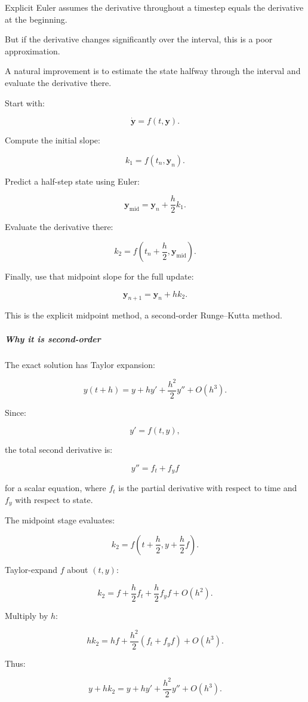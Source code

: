 Explicit Euler assumes the derivative throughout a timestep equals the derivative at the beginning.

But if the derivative changes significantly over the interval, this is a poor approximation.

A natural improvement is to estimate the state halfway through the interval and evaluate the derivative there.

Start with:

\[
\dot{\mathbf y}=f(t,\mathbf y).
\]

Compute the initial slope:

\[
k_1=f(t_n,\mathbf y_n).
\]

Predict a half-step state using Euler:

\[
\mathbf y_{\mathrm{mid}} = \mathbf y_n+\frac h2k_1.
\]

Evaluate the derivative there:

\[
k_2=f\left(t_n+\frac h2,\mathbf y_{\mathrm{mid}}\right).
\]

Finally, use that midpoint slope for the full update:

\[
\boxed{ \mathbf y_{n+1}=\mathbf y_n+hk_2 }.
\]

This is the explicit midpoint method, a second-order Runge--Kutta method.

\subparagraph{Why it is second-order}\label{02-foundations-ii-ch025-why-it-is-second-order}

The exact solution has Taylor expansion:

\[
y(t+h) = y+hy'+\frac{h^2}{2}y''+O(h^3).
\]

Since:

\[
y'=f(t,y),
\]

the total second derivative is:

\[
y''=f_t+f_yf
\]

for a scalar equation, where \(f_t\) is the partial derivative with respect to time and \(f_y\) with respect to state.

The midpoint stage evaluates:

\[
k_2=f\left(t+\frac h2,y+\frac h2f\right).
\]

Taylor-expand \(f\) about \((t,y)\):

\[
k_2 = f+\frac h2f_t+\frac h2f_yf+O(h^2).
\]

Multiply by \(h\):

\[
hk_2 = hf+\frac{h^2}{2}(f_t+f_yf)+O(h^3).
\]

Thus:

\[
y+hk_2 = y+hy'+\frac{h^2}{2}y''+O(h^3).
\]

